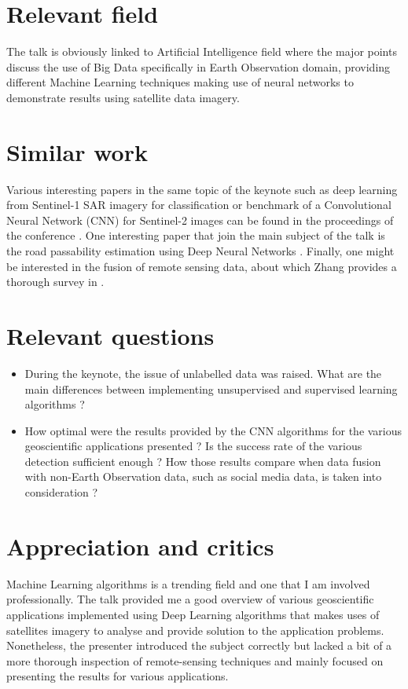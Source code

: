 \documentclass[11pt,a4paper]{article}
\begin{document}
\section{Relevant field}

The talk is obviously linked to Artificial Intelligence field where the major points discuss the use of Big Data specifically in Earth Observation domain, providing different Machine Learning techniques making use of neural networks to demonstrate results using satellite data imagery.

\section{Similar work}

Various interesting papers in the same topic of the keynote such as deep learning from Sentinel-1 SAR imagery for classification or benchmark of a Convolutional Neural Network (CNN) for Sentinel-2 images can be found in the proceedings of the conference . One interesting paper that join the main subject of the talk is the road passability estimation using Deep Neural Networks . Finally, one might be interested in the fusion of remote sensing data, about which Zhang provides a thorough survey in .

\section{Relevant questions}

\begin{itemize}
  \item During the keynote, the issue of unlabelled data was raised. What are the main differences between implementing unsupervised and supervised learning algorithms ?
  \item How optimal were the results provided by the CNN algorithms for the various geoscientific applications presented ? Is the success rate of the various detection sufficient enough ? How those results compare when data fusion with non-Earth Observation data, such as social media data, is taken into consideration ?
\end{itemize}

\section{Appreciation and critics}

Machine Learning algorithms is a trending field and one that I am involved professionally. The talk provided me a good overview of various geoscientific applications implemented using Deep Learning algorithms that makes uses of satellites imagery to analyse and provide solution to the application problems. Nonetheless, the presenter introduced the subject correctly but lacked a bit of a more thorough inspection of remote-sensing techniques and mainly focused on presenting the results for various applications.

\end{document}

